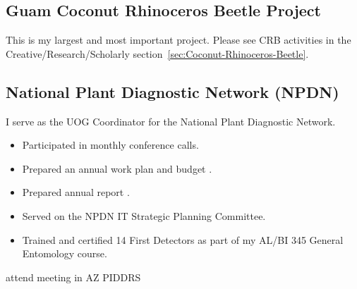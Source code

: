 \subsection{Guam Coconut Rhinoceros Beetle Project}

This is my largest and most important project. Please see CRB activities in the Creative/Research/Scholarly section~\ref{sec:Coconut-Rhinoceros-Beetle}.

\subsection{National Plant Diagnostic Network (NPDN)}
\begin{refsection}
	
I serve as the UOG Coordinator for the National Plant Diagnostic Network. 

\activities

\begin{itemize}
\item Participated in monthly conference calls.
\item Prepared an annual work plan and budget \cite{moore_university_2018}.
\item Prepared annual report \cite{moore_npdn_2018}.
\item Served on the NPDN IT Strategic Planning Committee.
\item Trained and certified 14 First Detectors as part of my AL/BI 345 General
Entomology course.
\end{itemize}

\plans

attend meeting in AZ
PIDDRS

\printbibliography[heading=none]

\end{refsection}	

